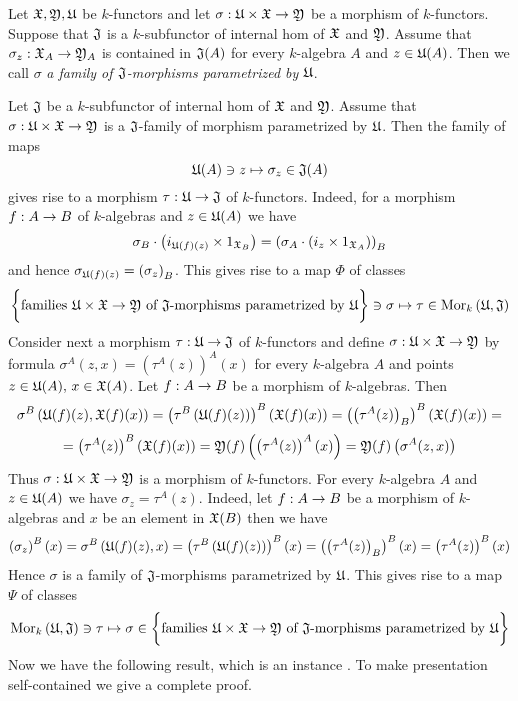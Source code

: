 \begin{definition}
Let ${\mathfrak X}, {\mathfrak Y},{\mathfrak U}$ be $k$-functors and let $\sigma:{\mathfrak U}\times {\mathfrak X} \rightarrow {\mathfrak Y}$ be a morphism of $k$-functors. Suppose that ${\mathfrak J}$ is a $k$-subfunctor of internal hom of ${\mathfrak X}$ and ${\mathfrak Y}$. Assume that $\sigma_z:{\mathfrak X}_A\rightarrow {\mathfrak Y}_A$ is contained in ${\mathfrak J}(A)$ for every $k$-algebra $A$ and $z\in {\mathfrak U}(A)$. Then we call $\sigma$ \textit{a family of ${\mathfrak J}$-morphisms parametrized by ${\mathfrak U}$}.
\end{definition}
\noindent
Let ${\mathfrak J}$ be a $k$-subfunctor of internal hom of ${\mathfrak X}$ and ${\mathfrak Y}$. Assume that $\sigma:{\mathfrak U}\times {\mathfrak X}\rightarrow {\mathfrak Y}$ is a ${\mathfrak J}$-family of morphism parametrized by ${\mathfrak U}$. Then the family of maps
$${\mathfrak U}(A)\ni z\mapsto \sigma_z\in {\mathfrak J}(A)$$
gives rise to a morphism $\tau:{\mathfrak U}\rightarrow {\mathfrak J}$ of $k$-functors. Indeed, for a morphism $f:A\rightarrow B$ of $k$-algebras and $z\in {\mathfrak U}(A)$ we have
$$\sigma_B\cdot \left(i_{{\mathfrak U}(f)(z)}\times 1_{{\mathfrak X}_B}\right) = \left(\sigma_A\cdot \left(i_{z}\times 1_{{\mathfrak X}_A}\right)\right)_B$$
and hence $\sigma_{{\mathfrak U}(f)(z)} = \left(\sigma_z\right)_B$. This gives rise to a map $\Phi$ of classes
$$\bigg\{\mbox{families }{\mathfrak U}\times {\mathfrak X}\rightarrow {\mathfrak Y}\mbox{ of }{\mathfrak J}\mbox{-morphisms parametrized by }{\mathfrak U}\bigg\}\ni \sigma\mapsto \tau\in \mathrm{Mor}_k\left({\mathfrak U},{\mathfrak J}\right)$$
Consider next a morphism $\tau:{\mathfrak U}\rightarrow {\mathfrak J}$ of $k$-functors and define $\sigma:{\mathfrak U}\times {\mathfrak X}\rightarrow {\mathfrak Y}$ by formula $\sigma^A(z,x) = \left(\tau^A(z)\right)^A(x)$ for every $k$-algebra $A$ and points $z\in {\mathfrak U}(A),\,x\in {\mathfrak X}(A)$. Let $f:A\rightarrow B$ be a morphism of $k$-algebras. Then
$$\sigma^B\left({\mathfrak U}(f)(z),{\mathfrak X}(f)(x)\right) = \left(\tau^B\left({\mathfrak U}(f)(z)\right)\right)^B\left({\mathfrak X}(f)(x)\right) = \left(\left(\tau^A(z)\right)_B\right)^B\left({\mathfrak X}(f)(x)\right) =$$
$$ = \left(\tau^A(z)\right)^B\left({\mathfrak X}(f)(x)\right) = {\mathfrak Y}(f)\left(\left(\tau^A(z)\right)^A(x)\right) = {\mathfrak Y}(f)\left(\sigma^A(z,x)\right)$$
Thus $\sigma:{\mathfrak U}\times {\mathfrak X}\rightarrow {\mathfrak Y}$ is a morphism of $k$-functors. For every $k$-algebra $A$ and $z\in{\mathfrak U}(A)$ we have $\sigma_z = \tau^A(z)$. Indeed, let $f:A\rightarrow B$ be a morphism of $k$-algebras and $x$ be an element in ${\mathfrak X}(B)$ then we have
$$\left(\sigma_z\right)^B(x) = \sigma^B\left({\mathfrak U}(f)(z),x\right) = \left(\tau^B\left({\mathfrak U}(f)(z)\right)\right)^B(x) = \left(\left(\tau^A(z)\right)_B\right)^B(x) = \left(\tau^A(z)\right)^B(x)$$
Hence $\sigma$ is a family of ${\mathfrak J}$-morphisms parametrized by ${\mathfrak U}$. This gives rise to a map $\Psi$ of classes
$$\mathrm{Mor}_k\left({\mathfrak U},{\mathfrak J}\right) \ni \tau \mapsto \sigma\in \bigg\{\mbox{families }{\mathfrak U}\times {\mathfrak X}\rightarrow {\mathfrak Y}\mbox{ of }{\mathfrak J}\mbox{-morphisms parametrized by }{\mathfrak U}\bigg\}$$
Now we have the following result, which is an instance {\cite[Theorem 6.3]{Presheaves}}. To make presentation self-contained we give a complete proof.  

